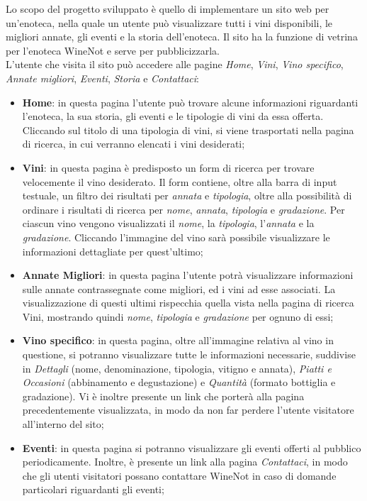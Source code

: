 Lo scopo del progetto sviluppato è quello di implementare un sito web per un'enoteca, nella quale un utente può visualizzare tutti i vini disponibili, le migliori annate, gli eventi e la storia dell'enoteca. 
Il sito ha la funzione di vetrina per l'enoteca WineNot e serve per pubblicizzarla. \\
L'utente che visita il sito può accedere alle pagine \textit{Home}, \textit{Vini}, \textit{Vino specifico}, \textit{Annate migliori}, \textit{Eventi}, \textit{Storia} e \textit{Contattaci}:
\begin{itemize}
	\item \textbf{Home}: in questa pagina l'utente può trovare alcune informazioni riguardanti l'enoteca, la sua storia, gli eventi e le tipologie di vini da essa offerta. Cliccando sul titolo di una tipologia di vini, si viene trasportati nella pagina di ricerca, in cui verranno elencati i vini desiderati; 
	\item \textbf{Vini}: in questa pagina è predisposto un form di ricerca per trovare velocemente il vino desiderato. Il form contiene, oltre alla barra di 
	input testuale, un filtro dei risultati per \textit{annata} e \textit{tipologia}, oltre alla possibilità di ordinare i risultati di ricerca per \textit{nome}, \textit{annata}, \textit{tipologia} e \textit{gradazione}. Per ciascun vino vengono visualizzati il \textit{nome}, la \textit{tipologia}, l'\textit{annata} e la \textit{gradazione}. Cliccando l'immagine del vino sarà possibile visualizzare le informazioni dettagliate per quest'ultimo;
	\item \textbf{Annate Migliori}: in questa pagina l'utente potrà visualizzare informazioni sulle annate contrassegnate come migliori, ed i vini ad esse associati. La visualizzazione di questi ultimi rispecchia quella vista nella pagina di ricerca Vini, mostrando quindi \textit{nome}, \textit{tipologia} e \textit{gradazione} per ognuno di essi;
	\item \textbf{Vino specifico}: in questa pagina, oltre all'immagine relativa al vino in questione, si potranno visualizzare tutte le informazioni necessarie, suddivise in \textit{Dettagli} (nome, denominazione, tipologia, vitigno e annata), \textit{Piatti e Occasioni} (abbinamento e degustazione) e \textit{Quantità} (formato bottiglia e gradazione). Vi è inoltre presente un link che porterà alla pagina precedentemente visualizzata, in modo da non far perdere l'utente visitatore all'interno del sito;
	\item \textbf{Eventi}: in questa pagina si potranno visualizzare gli eventi offerti al pubblico periodicamente. Inoltre, è presente un link alla pagina \textit{Contattaci}, in modo che gli utenti visitatori possano contattare WineNot in caso di domande particolari riguardanti gli eventi;

\end{itemize}
